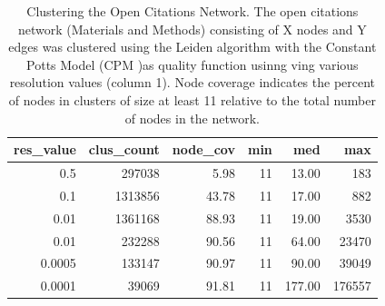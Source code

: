 \documentclass[12pt, oneside]{article}   	%
\begin{document}
\begin{table}[ht]
\centering
\begin{tabular}{rrrrrr}
  \hline
 res\_value & clus\_count & node\_cov & min & med & max \\ 
  \hline
0.5 & 297038 & 5.98 &  11 & 13.00 & 183 \\ 
0.1 & 1313856 & 43.78 &  11 & 17.00 & 882 \\ 
0.01 & 1361168 & 88.93 &  11 & 19.00 & 3530 \\ 
0.01 & 232288 & 90.56 &  11 & 64.00 & 23470 \\ 
0.0005 & 133147 & 90.97 &  11 & 90.00 & 39049 \\  
0.0001 & 39069 & 91.81 &  11 & 177.00 & 176557 \\ 
   \hline
\end{tabular}
\caption{Clustering the Open Citations Network. The open citations network (Materials and Methods) consisting of X nodes and Y edges was clustered using the Leiden algorithm with the Constant Potts Model (CPM )as quality function usinng ving various resolution values (column 1). Node coverage indicates the percent of nodes in clusters of size at least 11 relative to the total number of nodes in the network.
 }
\end{table}
\end{document}
